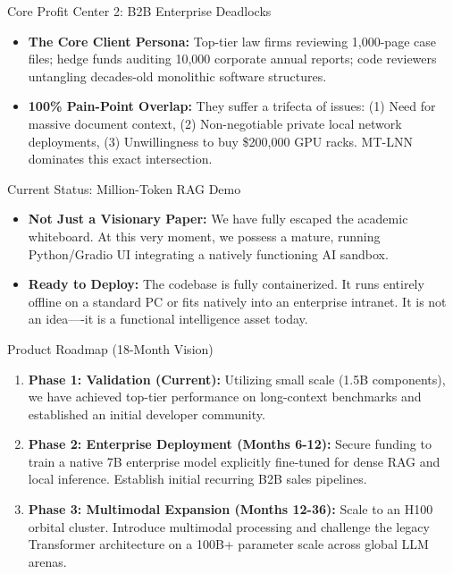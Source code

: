 ﻿\documentclass[aspectratio=169, 10pt]{beamer}
\begin{document}
\begin{frame}{Core Profit Center 2: B2B Enterprise Deadlocks}
\begin{itemize}
    \item \textbf{The Core Client Persona:} Top-tier law firms reviewing 1,000-page case files; hedge funds auditing 10,000 corporate annual reports; code reviewers untangling decades-old monolithic software structures.
    \item \textbf{100\% Pain-Point Overlap:} They suffer a trifecta of issues: (1) Need for massive document context, (2) Non-negotiable private local network deployments, (3) Unwillingness to buy \$200,000 GPU racks. MT-LNN dominates this exact intersection.
\end{itemize}
\end{frame}

\begin{frame}{Current Status: Million-Token RAG Demo}
\begin{itemize}
    \item \textbf{Not Just a Visionary Paper:} We have fully escaped the academic whiteboard. At this very moment, we possess a mature, running Python/Gradio UI integrating a natively functioning AI sandbox.
    \item \textbf{Ready to Deploy:} The codebase is fully containerized. It runs entirely offline on a standard PC or fits natively into an enterprise intranet. It is not an idea----it is a functional intelligence asset today.
\end{itemize}
\end{frame}

\begin{frame}{Product Roadmap (18-Month Vision)}
\begin{enumerate}
    \item \textbf{Phase 1: Validation (Current):} Utilizing small scale (1.5B components), we have achieved top-tier performance on long-context benchmarks and established an initial developer community.
    \vspace{0.4em}
    \item \textbf{Phase 2: Enterprise Deployment (Months 6-12):} Secure funding to train a native 7B enterprise model explicitly fine-tuned for dense RAG and local inference. Establish initial recurring B2B sales pipelines.
    \vspace{0.4em}
    \item \textbf{Phase 3: Multimodal Expansion (Months 12-36):} Scale to an H100 orbital cluster. Introduce multimodal processing and challenge the legacy Transformer architecture on a 100B+ parameter scale across global LLM arenas.
\end{enumerate}
\end{frame}
\end{document}
